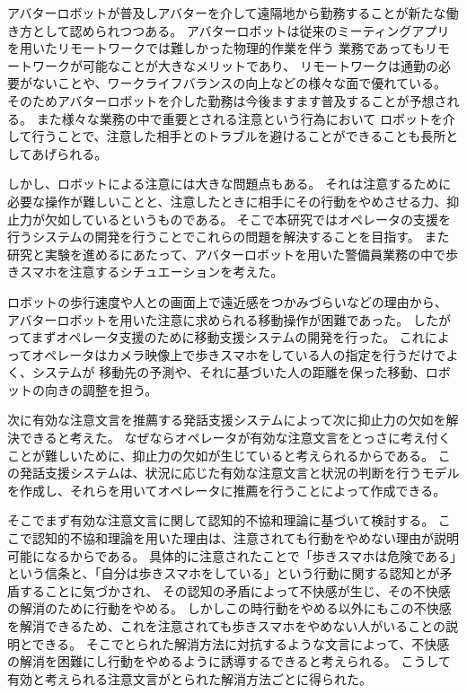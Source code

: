 \documentclass{kuisthesis}
\date{2024年1月31日}
\begin{document}
\maketitle

\begin{jabstract}


アバターロボットが普及しアバターを介して遠隔地から勤務することが新たな働き方として認められつつある。
アバターロボットは従来のミーティングアプリを用いたリモートワークでは難しかった物理的作業を伴う
業務であってもリモートワークが可能なことが大きなメリットであり、
リモートワークは通勤の必要がないことや、ワークライフバランスの向上などの様々な面で優れている。
そのためアバターロボットを介した勤務は今後ますます普及することが予想される。
また様々な業務の中で重要とされる注意という行為において
ロボットを介して行うことで、注意した相手とのトラブルを避けることができることも長所としてあげられる。

しかし、ロボットによる注意には大きな問題点もある。
それは注意するために必要な操作が難しいことと、注意したときに相手にその行動をやめさせる力、抑止力が欠如しているというものである。
そこで本研究ではオペレータの支援を行うシステムの開発を行うことでこれらの問題を解決することを目指す。
また研究と実験を進めるにあたって、アバターロボットを用いた警備員業務の中で歩きスマホを注意するシチュエーションを考えた。


ロボットの歩行速度や人との画面上で遠近感をつかみづらいなどの理由から、
アバターロボットを用いた注意に求められる移動操作が困難であった。
したがってまずオペレータ支援のために移動支援システムの開発を行った。
これによってオペレータはカメラ映像上で歩きスマホをしている人の指定を行うだけでよく、システムが
移動先の予測や、それに基づいた人の距離を保った移動、ロボットの向きの調整を担う。

次に有効な注意文言を推薦する発話支援システムによって次に抑止力の欠如を解決できると考えた。
なぜならオペレータが有効な注意文言をとっさに考え付くことが難しいために、抑止力の欠如が生じていると考えられるからである。
この発話支援システムは、状況に応じた有効な注意文言と状況の判断を行うモデルを作成し、それらを用いてオペレータに推薦を行うことによって作成できる。

そこでまず有効な注意文言に関して認知的不協和理論に基づいて検討する。
ここで認知的不協和理論を用いた理由は、注意されても行動をやめない理由が説明可能になるからである。
具体的に注意されたことで「歩きスマホは危険である」という信条と、「自分は歩きスマホをしている」という行動に関する認知とが矛盾することに気づかされ、
その認知の矛盾によって不快感が生じ、その不快感の解消のために行動をやめる。
しかしこの時行動をやめる以外にもこの不快感を解消できるため、これを注意されても歩きスマホをやめない人がいることの説明とできる。
そこでとられた解消方法に対抗するような文言によって、不快感の解消を困難にし行動をやめるように誘導するできると考えられる。
こうして有効と考えられる注意文言がとられた解消方法ごとに得られた。


\end{jabstract}
\end{document}
